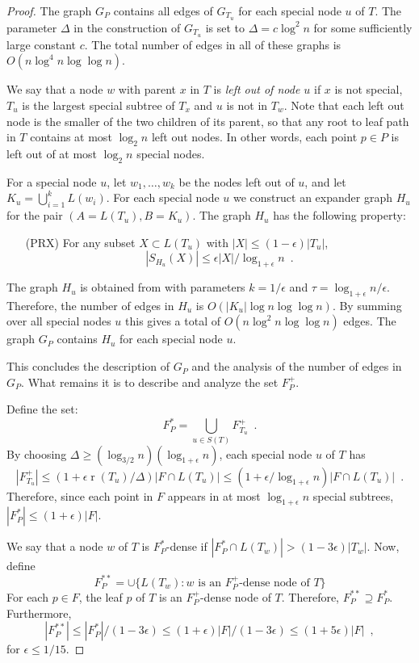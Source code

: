 \documentclass{patmorin}
\DeclareMathOperator{\rank}{r}
\begin{document}
\begin{proof}
  The graph $G_P$ contains all edges of $G_{T_u}$ for each special node
  $u$ of $T$.  The parameter $\Delta$ in the construction of $G_{T_u}$
  is set to $\Delta=c\log^2 n$ for some sufficiently large constant $c$.
  The total number of edges in all of these graphs is $O(n\log^4
  n\log\log n)$.  

  We say that a node $w$ with parent $x$ in $T$ is \emph{left out of
  node $u$} if $x$ is not special, $T_u$ is the largest special subtree
  of $T_x$ and $u$ is not in $T_w$. Note that each left out node is the
  smaller of the two children of its parent, so that any root to leaf
  path in $T$ contains at most $\log_2 n$ left out nodes.  In other words,
  each point $p\in P$ is left out of at most $\log_2 n$ special nodes.
	
  For a special node $u$, let $w_1,\ldots,w_k$ be the nodes left out of $u$, and  let $K_u=\bigcup_{i=1}^k L(w_i)$.  For each special node $u$ we construct
  an expander graph $H_u$ for the pair
  $(A=L(T_u),B=K_u)$. The graph $H_u$ has the following property:
  \begin{enumerate}
    \item[(PRX)] For any subset $X\subset L(T_u)$ with $|X|\le (1-\epsilon)|T_u|$, 
  \[ |S_{H_u}(X)| \le \epsilon|X|/\log_{1+\epsilon} n \enspace . \] 
  \end{enumerate}
  The graph $H_u$ is obtained from  with parameters
  $k=1/\epsilon$ and $\tau=\log_{1+\epsilon}n/\epsilon$.  Therefore,
  the number of edges in $H_u$ is $O(|K_u|\log n\log\log n)$. 
  By summing over all special nodes $u$ this gives a total of $O(n\log^2
  n\log\log n)$ edges.  The graph $G_P$ contains $H_u$ for each special
  node $u$.

  This concludes the description of $G_P$ and the analysis of the number
  of edges in $G_P$. What remains it is to describe and analyze the
  set $F^+_P$.


  Define the set:
  \[  
    F^*_P = \bigcup_{u\in S(T)} F^+_{T_u} \enspace .
  \]
  By choosing $\Delta \ge (\log_{3/2} n)(\log_{1+\epsilon}
  n)$, each special node $u$ of $T$ has 
  \[ |F^+_{T_u}|\le (1+\epsilon\rank(T_{u})/\Delta)|F\cap L(T_u)| 
        \le (1+\epsilon/\log_{1+\epsilon} n)|F\cap L(T_u)| \enspace . 
  \]
   Therefore, since
  each point in $F$ appears in at most $\log_{1+\epsilon} n$ special
  subtrees, $|F^*_P|\le (1+\epsilon)|F|$.

  We say that a node $w$ of $T$ is $F^*_P$-dense if $|F^*_P \cap L(T_w)| >
  (1-3\epsilon)|T_w|$.  Now, define
  \[  
     F^{**}_P = \cup\{ L(T_w) : \text{$w$ is an $F^+_P$-dense node of $T$} \}
  \]
  For each $p\in F$, the leaf $p$ of $T$ is an $F^+_P$-dense node of
  $T$. Therefore, $F^{**}_P\supseteq F^{*}_P$.  Furthermore,
  \[
      |F^{**}_P| \le |F^*_P|/(1-3\epsilon) \le (1+\epsilon)|F|/(1-3\epsilon) \le (1+5\epsilon)|F| \enspace ,
  \]
  for $\epsilon \le 1/15$.


\end{proof}
\end{document}
